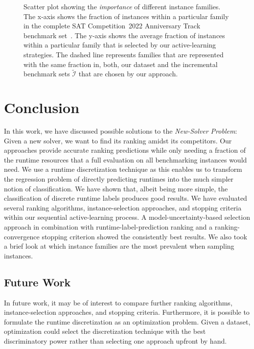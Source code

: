\documentclass[runningheads]{llncs}
\begin{document}
\begin{figure}[tb!]
  \centering
  \caption{
    Scatter plot showing the \emph{importance} of different instance families.
    The x-axis shows the fraction of instances within a particular family in the complete SAT Competition~2022 Anniversary Track benchmark set~\cite{sat2022}.
    The y-axis shows the average fraction of instances within a particular family that is selected by our active-learning strategies.
    The dashed line represents families that are represented with the same fraction in, both, our dataset and the incremental benchmark sets $\tilde{\mathcal{I}}$ that are chosen by our approach.
  }
  \label{fig:annifinalfamilies}
\end{figure}

\section{Conclusion}
In this work, we have discussed possible solutions to the \emph{New-Solver Problem}:
Given a new solver, we want to find its ranking amidst its competitors.
Our approaches provide accurate ranking predictions while only needing a fraction of the runtime resources that a full evaluation on all benchmarking instances would need.
We use a runtime discretization technique as this enables us to transform the regression problem of directly predicting runtimes into the much simpler notion of classification.
We have shown that, albeit being more simple, the classification of discrete runtime labels produces good results.
We have evaluated several ranking algorithms, instance-selection approaches, and stopping criteria within our sequential active-learning process.
A model-uncertainty-based selection approach in combination with runtime-label-prediction ranking and a ranking-convergence stopping criterion showed the consistently best results.
We also took a brief look at which instance families are the most prevalent when sampling instances.

\subsection{Future Work}
In future work, it may be of interest to compare further ranking algorithms, instance-selection approaches, and stopping criteria.
Furthermore, it is possible to formulate the runtime discretization as an optimization problem.
Given a dataset, optimization could select the discretization technique with the best discriminatory power rather than selecting one approach upfront by hand.
\end{document}
